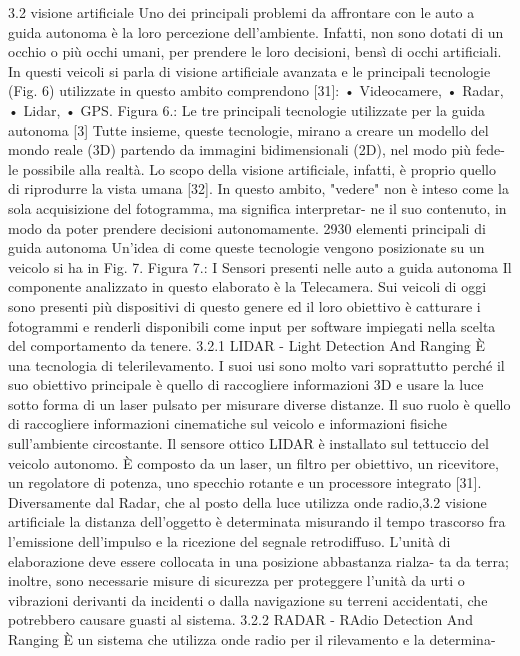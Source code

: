 \documentclass[14pt]{extarticle}
\begin{document}
\begin{itemize}
3.2
visione artificiale
Uno dei principali problemi da affrontare con le auto a guida autonoma
è la loro percezione dell’ambiente. Infatti, non sono dotati di un occhio o
più occhi umani, per prendere le loro decisioni, bensì di occhi artificiali.
In questi veicoli si parla di visione artificiale avanzata e le principali
tecnologie (Fig. 6) utilizzate in questo ambito comprendono [31]:
• Videocamere,
• Radar,
• Lidar,
• GPS.
Figura 6.: Le tre principali tecnologie utilizzate per la guida autonoma [3]
Tutte insieme, queste tecnologie, mirano a creare un modello del mondo
reale (3D) partendo da immagini bidimensionali (2D), nel modo più fede-
le possibile alla realtà. Lo scopo della visione artificiale, infatti, è proprio
quello di riprodurre la vista umana [32]. In questo ambito, "vedere" non è
inteso come la sola acquisizione del fotogramma, ma significa interpretar-
ne il suo contenuto, in modo da poter prendere decisioni autonomamente.
2930
elementi principali di guida autonoma
Un’idea di come queste tecnologie vengono posizionate su un veicolo si
ha in Fig. 7.
Figura 7.: I Sensori presenti nelle auto a guida autonoma
Il componente analizzato in questo elaborato è la Telecamera. Sui veicoli
di oggi sono presenti più dispositivi di questo genere ed il loro obiettivo
è catturare i fotogrammi e renderli disponibili come input per software
impiegati nella scelta del comportamento da tenere.
3.2.1
LIDAR - Light Detection And Ranging
È una tecnologia di telerilevamento. I suoi usi sono molto vari soprattutto
perché il suo obiettivo principale è quello di raccogliere informazioni
3D e usare la luce sotto forma di un laser pulsato per misurare diverse
distanze. Il suo ruolo è quello di raccogliere informazioni cinematiche sul
veicolo e informazioni fisiche sull’ambiente circostante. Il sensore ottico
LIDAR è installato sul tettuccio del veicolo autonomo. È composto da un
laser, un filtro per obiettivo, un ricevitore, un regolatore di potenza, uno
specchio rotante e un processore integrato [31].
Diversamente dal Radar, che al posto della luce utilizza onde radio,3.2 visione artificiale
la distanza dell’oggetto è determinata misurando il tempo trascorso fra
l’emissione dell’impulso e la ricezione del segnale retrodiffuso. L’unità
di elaborazione deve essere collocata in una posizione abbastanza rialza-
ta da terra; inoltre, sono necessarie misure di sicurezza per proteggere
l’unità da urti o vibrazioni derivanti da incidenti o dalla navigazione su
terreni accidentati, che potrebbero causare guasti al sistema.
3.2.2
RADAR - RAdio Detection And Ranging
È un sistema che utilizza onde radio per il rilevamento e la determina-

\end{itemize}
\end{document}
